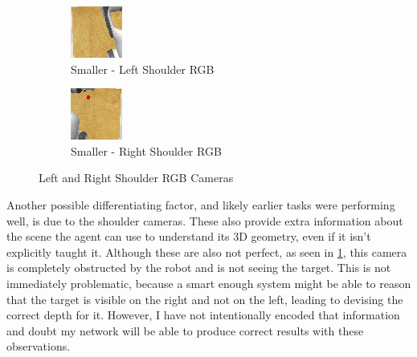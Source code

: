 \begin{figure}[htpb]
\begin{subfigure}{0.40\linewidth}
    \includegraphics[width=0.7\linewidth]{assets/depth-interfacing/smaller-l_rgb.png}
    \caption{Smaller - Left Shoulder RGB}\label{subfig:smaller-l-shoulder}
  \end{subfigure}
  \begin{subfigure}{0.40\linewidth}
    \centering
    \includegraphics[width=0.7\linewidth]{assets/depth-interfacing/smaller-r_rgb.png}
    \caption{Smaller - Right Shoulder RGB}\label{subfig:smaller-r-shoulder}
  \end{subfigure}
  \caption{Left and Right Shoulder RGB Cameras}\label{fig:di-lr-shoulder}
\end{figure}


Another possible differentiating factor, and likely earlier tasks were performing well, is due to the shoulder cameras. These also provide extra information about the scene the agent can use to understand its 3D geometry, even if it isn't explicitly taught it. Although these are also not perfect, as seen in \ref{subfig:smaller-l-shoulder}, this camera is completely obstructed by the robot and is not seeing the target. This is not immediately problematic, because a smart enough system might be able to reason that the target is visible on the right and not on the left, leading to devising the correct depth for it. However, I have not intentionally encoded that information and doubt my network will be able to produce correct results with these observations.

